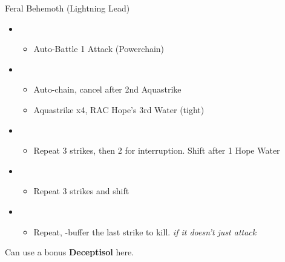 	\begin{battle}[0:33]{Feral Behemoth (Lightning Lead)}
		\begin{itemize}
			\item \first
			      \begin{itemize}
				      \item Auto-Battle 1 Attack (Powerchain)
			      \end{itemize}
			\item \fourth
			      \begin{itemize}
				      \item Auto-chain, cancel after 2nd Aquastrike
				      \item Aquastrike x4, RAC Hope's 3rd Water (tight)
			      \end{itemize}
			\item \fifth
			      \begin{itemize}
				      \item Repeat 3 strikes, then 2 for interruption. Shift after 1 Hope Water
			      \end{itemize}
			\item \fourth
				  \begin{itemize}
				  	  \item Repeat 3 strikes and shift
				  \end{itemize}
			\item \fifth
			      \begin{itemize}
				      \item Repeat, \com-buffer the last strike to kill. \textit{if it doesn't just attack}
			      \end{itemize}
		\end{itemize}
	\end{battle}

	  Can use a bonus \textbf{Deceptisol} here.

